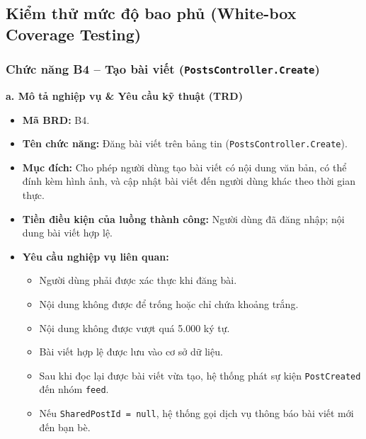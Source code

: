 \documentclass[11pt,a4paper]{article}
\begin{document}
\subsection{Kiểm thử mức độ bao phủ (White-box Coverage Testing)}

\subsubsection{Chức năng B4 -- Tạo bài viết (\texttt{PostsController.Create})}

\noindent\textbf{a. Mô tả nghiệp vụ \& Yêu cầu kỹ thuật (TRD)}
\begin{itemize}[leftmargin=1.2cm, noitemsep]
    \item[\textbf{--}] \textbf{Mã BRD:} B4.
    \item[\textbf{--}] \textbf{Tên chức năng:} Đăng bài viết trên bảng tin (\texttt{PostsController.Create}).
    \item[\textbf{--}] \textbf{Mục đích:} Cho phép người dùng tạo bài viết có nội dung văn bản, có thể đính kèm hình ảnh, và cập nhật bài viết đến người dùng khác theo thời gian thực.
    \item[\textbf{--}] \textbf{Tiền điều kiện của luồng thành công:} Người dùng đã đăng nhập; nội dung bài viết hợp lệ.
    \item[\textbf{--}] \textbf{Yêu cầu nghiệp vụ liên quan:}
    \begin{itemize}[leftmargin=0.8cm, label=$\bullet$, noitemsep]
        \item Người dùng phải được xác thực khi đăng bài.
        \item Nội dung không được để trống hoặc chỉ chứa khoảng trắng.
        \item Nội dung không được vượt quá 5.000 ký tự.
        \item Bài viết hợp lệ được lưu vào cơ sở dữ liệu.
        \item Sau khi đọc lại được bài viết vừa tạo, hệ thống phát sự kiện \texttt{PostCreated} đến nhóm \texttt{feed}.
        \item Nếu \texttt{SharedPostId = null}, hệ thống gọi dịch vụ thông báo bài viết mới đến bạn bè.
    \end{itemize}
\end{itemize}
\end{document}
